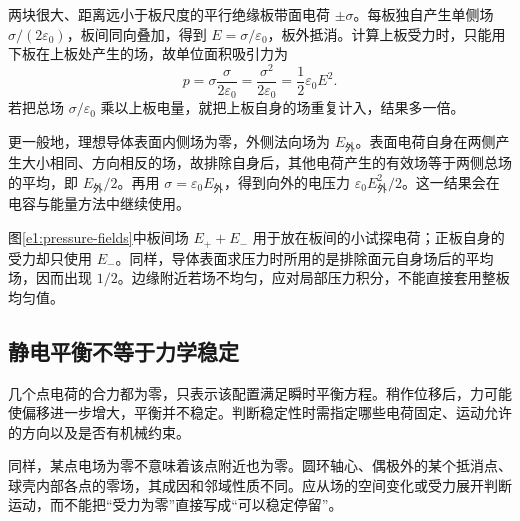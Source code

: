 两块很大、距离远小于板尺度的平行绝缘板带面电荷 $\pm\sigma$。每板独自产生单侧场 $\sigma/(2\varepsilon_0)$，板间同向叠加，得到 $E=\sigma/\varepsilon_0$，板外抵消。计算上板受力时，只能用下板在上板处产生的场，故单位面积吸引力为
\[
 p=\sigma\frac{\sigma}{2\varepsilon_0}
 =\frac{\sigma^2}{2\varepsilon_0}=\frac12\varepsilon_0E^2.
\]
若把总场 $\sigma/\varepsilon_0$ 乘以上板电量，就把上板自身的场重复计入，结果多一倍。

更一般地，理想导体表面内侧场为零，外侧法向场为 $E_{\text{外}}$。表面电荷自身在两侧产生大小相同、方向相反的场，故排除自身后，其他电荷产生的有效场等于两侧总场的平均，即 $E_{\text{外}}/2$。再用 $\sigma=\varepsilon_0E_{\text{外}}$，得到向外的电压力 $\varepsilon_0E_{\text{外}}^2/2$。这一结果会在电容与能量方法中继续使用。


图\ref{e1:pressure-fields}中板间场 $E_++E_-$ 用于放在板间的小试探电荷；正板自身的受力却只使用 $E_-$。同样，导体表面求压力时所用的是排除面元自身场后的平均场，因而出现 $1/2$。边缘附近若场不均匀，应对局部压力积分，不能直接套用整板均匀值。

\subsection{静电平衡不等于力学稳定}

几个点电荷的合力都为零，只表示该配置满足瞬时平衡方程。稍作位移后，力可能使偏移进一步增大，平衡并不稳定。判断稳定性时需指定哪些电荷固定、运动允许的方向以及是否有机械约束。

同样，某点电场为零不意味着该点附近也为零。圆环轴心、偶极外的某个抵消点、球壳内部各点的零场，其成因和邻域性质不同。应从场的空间变化或受力展开判断运动，而不能把“受力为零”直接写成“可以稳定停留”。

